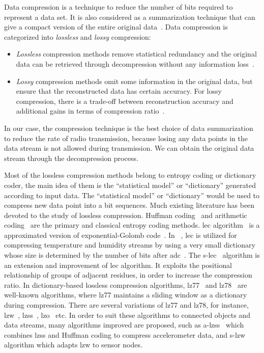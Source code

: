 Data compression is a technique to reduce the number of bits required to
represent a data set. It is also considered as a summarization technique
that can give a compact version of the entire original
data~\cite{hesabi2015data}. Data compression is categorized into
\emph{lossless} and \emph{lossy} compression:
\begin{itemize}
    \item \emph{Lossless} compression methods remove statistical redundancy and
    the original data can be retrieved through decompression without any
    information loss~\cite{hesabi2015data}.
    \item \emph{Lossy} compression methods omit some information in the original
    data, but ensure that the reconstructed data has certain accuracy. For lossy
    compression, there is a trade-off between reconstruction accuracy and
    additional gains in terms of compression ratio~\cite{zordan2014performance}.
\end{itemize}

In our case, the compression technique is the best choice of data summarization
to reduce the rate of radio transmission, because losing any data points in the
data stream is not allowed during transmission. We can obtain the original data
stream through the decompression process. 

Most of the lossless compression methods belong to entropy coding or dictionary
coder, the main idea of them is the ``statistical model'' or ``dictionary''
generated according to input data. The ``statistical model'' or ``dictionary''
would be used to compress new data point into a bit sequences. Much existing
literature has been devoted to the study of lossless compression. Huffman
coding~\cite{huffman1952method} and arithmetic
coding~\cite{langdon1984introduction} are the primary and classical entropy
coding methods. \acrfull{lec} algorithm~\cite{marcelloni2008simple} is a
approximated version of exponential-Golomb code~\cite{teuhola1978compression}.
In ~\cite{marcelloni2008simple}, \acrshort{lec} is utilized for compressing
temperature and humidity streams by using a very small dictionary whose size is
determined by the number of bits after
\acrfull{adc}~\cite{marcelloni2008simple,marcelloni2009efficient}. The
\acrfull{s-lec}~\cite{li2016temporal} algorithm is an extension and improvement
of \acrshort{lec} algorithm. It exploits the positional relationship of groups
of adjacent residues, in order to increase the compression ratio. In
dictionary-based lossless compression algorithms,
\acrfull{lz77}~\cite{ziv1977universal} and
\acrfull{lz78}~\cite{ziv1978compression} are well-known algorithms, where
\acrshort{lz77} maintains a sliding window as a dictionary during compression.
There are several variations of \acrshort{lz77} and \acrshort{lz78}, for
instance, \acrfull{lzw}~\cite{sadler2006data},
\acrfull{lzss}~\cite{storer1982data}, \acrfull{lzo}~\cite{lzocite} etc. In order
to suit these algorithms to connected objects and data streams, many algorithms
improved are proposed, such as \acrfull{a-lzss}~\cite{pope2018accelerometer}
which combines \acrshort{lzss} and Huffman coding to compress accelerometer
data, and \acrfull{s-lzw}~\cite{sadler2006data} algorithm which adapts
\acrshort{lzw} to sensor nodes.

